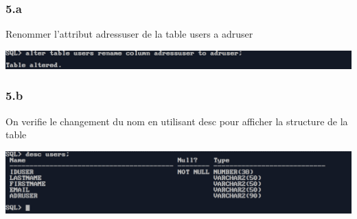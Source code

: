 \subsubsection*{5.a}
Renommer l'attribut adressuser de la table users a adruser



\begin{center}
    \includegraphics[width=\textwidth]{ScreenShot/Partie2/rename.png}
\end{center}

\vspace{0.25cm}
\subsubsection*{5.b}
On verifie le changement du nom en utilisant desc pour afficher la structure de la table



\begin{center}
    \includegraphics[width=\textwidth]{ScreenShot/Partie2/verifyrename.png}
\end{center}
